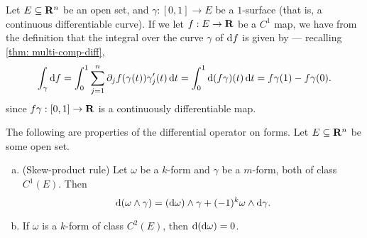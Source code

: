 \begin{example}
    \label{exp:curve-integral}
    Let \(E \subseteq \mathbf{R}^n\) be an open set, and \(\gamma: [0, 1] \to E\) be a
    \(1\)-surface (that is, a continuous differentiable curve). If we let \(f: E \to
    \mathbf{R}\) be a \(C^1\) map, we have from the definition that the integral over the
    curve \(\gamma\) of \(\mathrm{d} f\) is given by --- recalling \cref{thm:
        multi-comp-diff},
    \[
        \int_{\gamma} \mathrm{d} f =
        \int_0^1 \sum_{j=1}^n \partial_j f (\gamma(t)) \gamma_j'(t)\, \mathrm{d} t
        = \int_0^1 \mathrm{d} (f \gamma)(t)\, \mathrm{d} t
        = f \gamma(1) - f \gamma(0).
    \]
    since \(f \gamma: [0, 1] \to \mathbf{R}\) is a continuously differentiable map.
\end{example}

\begin{theorem}
    \label{thm:differential-operator-forms-properties}
    The following are properties of the differential operator on forms. Let \(E
    \subseteq \mathbf{R}^n\) be some open set.
    \begin{enumerate}[(a)]\setlength\itemsep{0em}
        \item (Skew-product rule) Let \(\omega\) be a \(k\)-form and \(\gamma\) be a
              \(m\)-form, both of class \(C^1(E)\). Then
              \[
                  \mathrm{d} (\omega \wedge \gamma)
                  = (\mathrm{d} \omega) \wedge \gamma + (-1)^k \omega \wedge \mathrm{d} \gamma.
              \]
        \item If \(\omega\) is a \(k\)-form of class \(C^2(E)\), then \(\mathrm{d}(\mathrm{d}
              \omega) = 0\).
    \end{enumerate}
\end{theorem}

